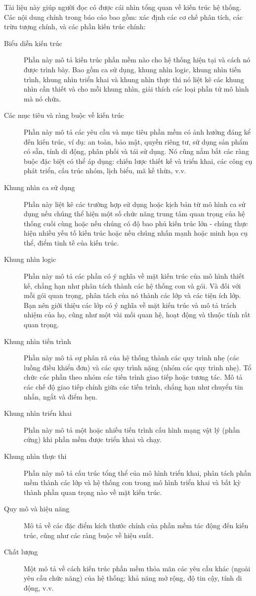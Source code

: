 \documentclass[./../main_file.tex]{subfiles}
\begin{document}
		
	Tài liệu này giúp người đọc có được cái nhìn tổng quan về kiến trúc hệ thống. Các nội dung chính trong báo cáo bao gồm: xác định các cơ chế phân tích, các trừu tượng chính, và các phần kiến trúc chính: 
	\begin{description}
		\item[Biểu diễn kiến trúc] Phần này mô tả kiến trúc phần mềm nào cho hệ thống hiện tại và cách nó được trình bày. Bao gồm ca sử dụng, khung nhìn logic, khung nhìn tiến trình, khung nhìn triển khai và khung nhìn thực thi nó liệt kê các khung nhìn cần thiết và cho mỗi khung nhìn, giải thích các loại phần tử mô hình mà nó chứa.
		\item[Các mục tiêu và ràng buộc về kiến trúc] Phần này mô tả các yêu cầu và mục tiêu phần mềm có ảnh hưởng đáng kể đến kiến trúc, ví dụ: an toàn, bảo mật, quyền riêng tư, sử dụng sản phẩm có sẵn, tính di động, phân phối và tái sử dụng. Nó cũng nắm bắt các ràng buộc đặc biệt có thể áp dụng: chiến lược thiết kế và triển khai, các công cụ phát triển, cấu trúc nhóm, lịch biểu, mã kế thừa, v.v.
		\item[Khung nhìn ca sử dụng] Phần này liệt kê các trường hợp sử dụng hoặc kịch bản từ mô hình ca sử dụng nếu chúng thể hiện một số chức năng trung tâm quan trọng của hệ thống cuối cùng hoặc nếu chúng có độ bao phủ kiến trúc lớn - chúng thực hiện nhiều yếu tố kiến trúc hoặc nếu chúng nhấn mạnh hoặc minh họa cụ thể, điểm tinh tế của kiến trúc.
		\item[Khung nhìn logic] Phần này mô tả các phần có ý nghĩa về mặt kiến trúc của mô hình thiết kế, chẳng hạn như phân tách thành các hệ thống con và gói. Và đối với mỗi gói quan trọng, phân tách của nó thành các lớp và các tiện ích lớp. Bạn nên giới thiệu các lớp có ý nghĩa về mặt kiến trúc và mô tả trách nhiệm của họ, cũng như một vài mối quan hệ, hoạt động và thuộc tính rất quan trọng.
		\item[Khung nhìn tiến trình] Phần này mô tả sự phân rã của hệ thống thành các quy trình nhẹ (các luồng điều khiển đơn) và các quy trình nặng (nhóm các quy trình nhẹ). Tổ chức các phần theo nhóm các tiến trình giao tiếp hoặc tương tác. Mô tả các chế độ giao tiếp chính giữa các tiến trình, chẳng hạn như chuyển tin nhắn, ngắt và điểm hẹn.
		\item[Khung nhìn triển khai] Phần này mô tả một hoặc nhiều tiến trình cấu hình mạng vật lý (phần cứng) khi phần mềm được triển khai và chạy.
		\item[Khung nhìn thực thi] Phần này mô tả cấu trúc tổng thể của mô hình triển khai, phân tách phần mềm thành các lớp và hệ thống con trong mô hình triển khai và bất kỳ thành phần quan trọng nào về mặt kiến trúc.
		\item[Quy mô và hiệu năng] Mô tả về các đặc điểm kích thước chính của phần mềm tác động đến kiến trúc, cũng như các ràng buộc về hiệu suất.
		\item[Chất lượng] Một mô tả về cách kiến trúc phần mềm thỏa mãn các yêu cầu khác (ngoài yêu cầu chức năng) của hệ thống: khả năng mở rộng, độ tin cậy, tính di động, v.v.
	\end{description}
		
\end{document}
